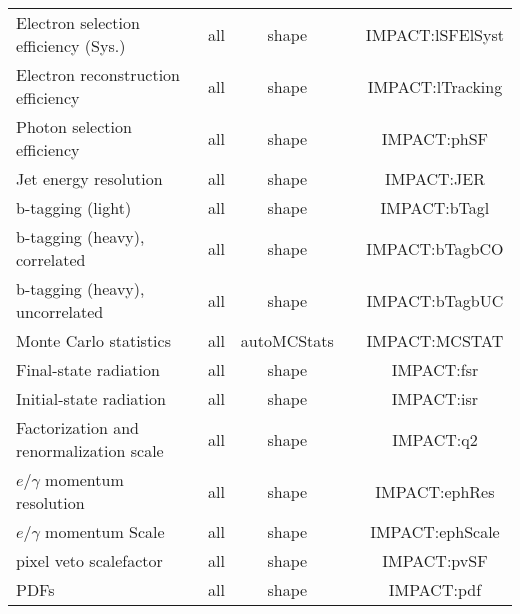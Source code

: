 \begin{table}
\begin{tabular}{l|c|c|c|c}
      Electron selection efficiency (Sys.)                & all                   & shape             &                     & IMPACT:lSFElSyst  \\
      Electron reconstruction efficiency                  & all                   & shape             &                     & IMPACT:lTracking  \\
      Photon selection efficiency                         & all                   & shape             &                     & IMPACT:phSF  \\
      Jet energy resolution                               & all                   & shape             &                     & IMPACT:JER  \\
      b-tagging (light)                                   & all                   & shape             &                     & IMPACT:bTagl  \\
      b-tagging (heavy), correlated                       & all                   & shape             &                     & IMPACT:bTagbCO  \\
      b-tagging (heavy), uncorrelated                     & all                   & shape             &                     & IMPACT:bTagbUC  \\
      Monte Carlo statistics                              & all                   & autoMCStats       &                     & IMPACT:MCSTAT  \\
      Final-state radiation                               & all                   & shape             &                     & IMPACT:fsr  \\
      Initial-state radiation                             & all                   & shape             &                     & IMPACT:isr  \\
      Factorization and renormalization scale             & all                   & shape             &                     & IMPACT:q2  \\
      $e/\gamma$ momentum resolution                      & all                   & shape             &                     & IMPACT:ephRes  \\
      $e/\gamma$ momentum Scale                           & all                   & shape             &                     & IMPACT:ephScale  \\
      pixel veto scalefactor                              & all                   & shape             &                     & IMPACT:pvSF  \\
      PDFs                                                & all                   & shape             &                     & IMPACT:pdf  \\

\end{tabular}
\end{table}
